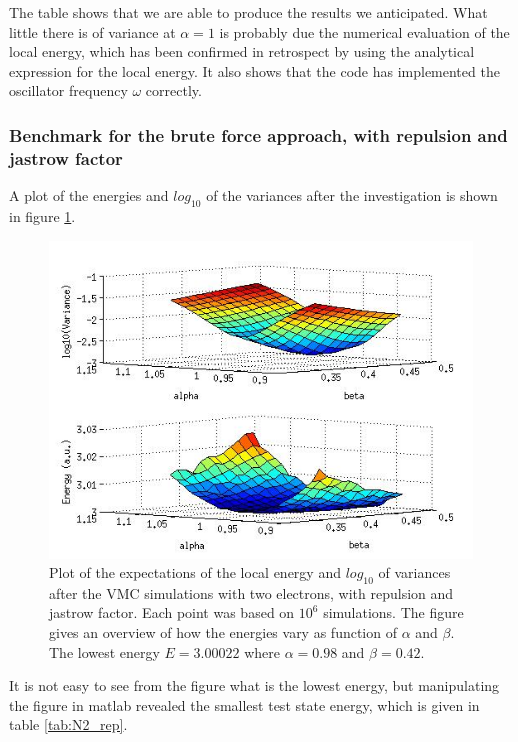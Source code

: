 The table shows that we are able to produce the results we anticipated.
What little there is of variance at $\alpha=1$ is probably due the numerical evaluation of the local energy, which has been confirmed in retrospect by using the analytical expression for the local energy. 
It also shows that the code has implemented the oscillator frequency $\omega$ correctly. 

\subsubsection{Benchmark for the brute force approach, with repulsion and jastrow factor}

A plot of the energies and $log_{10}$ of the variances after the investigation is shown in figure \ref{fig:N2_rep}.

\begin{figure}[h!]
	\centering
	\includegraphics[width=\textwidth]{results/N2_rep.jpg}
	\caption{Plot of the expectations of the local energy and $log_{10}$ of variances after the VMC simulations with two electrons, with repulsion and jastrow factor. 
	Each point was based on $10^6$ simulations. 
	The figure gives an overview of how the energies vary as function of $\alpha$ and $\beta$.
	The lowest energy $E= 3.00022$ where $\alpha = 0.98$ and $\beta = 0.42$.}
	\label{fig:N2_rep}
\end{figure}

It is not easy to see from the figure what is the lowest energy, but manipulating the figure in matlab revealed the smallest test state energy, which is given in table \ref{tab:N2_rep}.

